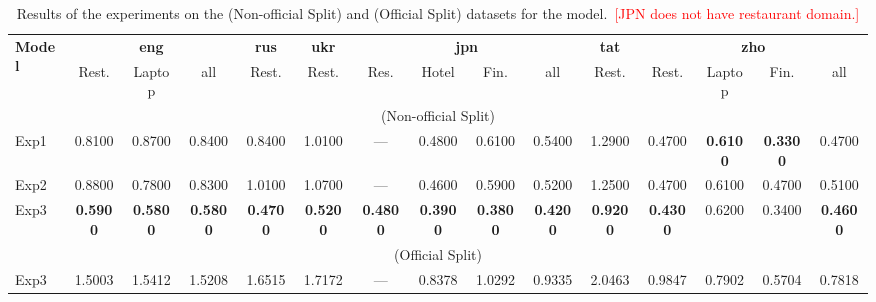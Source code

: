 \begin{table}[h]
    \centering
    \footnotesize
    \setlength{\tabcolsep}{3.5pt}
    \renewcommand{\arraystretch}{1.05}
    \begin{tabular}{l|ccc|c|c|cccc|c|cccc}
    \toprule
    \multirow{2}{*}{\textbf{Model}} &
    \multicolumn{3}{c|}{\textbf{eng}} &
    \textbf{rus} &
    \textbf{ukr} &
    \multicolumn{4}{c|}{\textbf{jpn}} &
    \textbf{tat} &
    \multicolumn{4}{c}{\textbf{zho}} \\
    \cline{2-15}
    & Rest. & Laptop & all & Rest. & Rest. & Res. & Hotel & Fin. & all & Rest. & Rest. & Laptop & Fin. & all \\
    \midrule
    \multicolumn{15}{c}{\dimabsaTrainEval{} (Non-official Split)} \\
    \midrule
    Exp1 & 0.8100 & 0.8700 & 0.8400 & 0.8400 & 1.0100 & --- & 0.4800 & 0.6100 & 0.5400 & 1.2900 & 0.4700 & \textbf{0.6100} & \textbf{0.3300} & 0.4700 \\
    Exp2 & 0.8800 & 0.7800 & 0.8300 & 1.0100 & 1.0700 & --- & 0.4600 & 0.5900 & 0.5200 & 1.2500 & 0.4700 & 0.6100 & 0.4700 & 0.5100 \\
    Exp3 & \textbf{0.5900} & \textbf{0.5800} & \textbf{0.5800} & \textbf{0.4700} & \textbf{0.5200} & \textbf{0.4800} & \textbf{0.3900} & \textbf{0.3800} & \textbf{0.4200} & \textbf{0.9200} & \textbf{0.4300} & 0.6200 & 0.3400 & \textbf{0.4600} \\
    \midrule
    \multicolumn{15}{c}{\dimabsaTest{} (Official Split)} \\
    \midrule
    Exp3 & 1.5003 & 1.5412 & 1.5208 & 1.6515 & 1.7172 & --- & 0.8378 & 1.0292 & 0.9335 & 2.0463 & 0.9847 & 0.7902 & 0.5704 & 0.7818 \\
    \bottomrule
    \end{tabular}
    \caption{Results of the experiments on the \dimabsaTrainEval{} (Non-official Split) and \dimabsaTest{} (Official Split) datasets for the \robertaBase{} model.~\textcolor{red}{[JPN does not have restaurant domain.]}}
    \label{tab:results}
\end{table}
